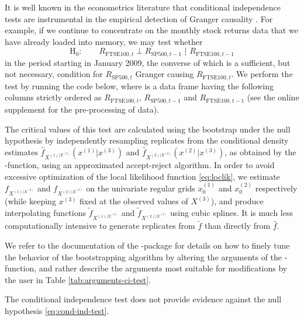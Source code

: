 It is well known in the econometrics literature that conditional independence tests are instrumental in the empirical detection of Granger causality \citep{gran:1980}. For example, if we continue to concentrate on the monthly stock returns data that we have already loaded into memory, we may test whether 
\begin{equation} 
\textrm{H}_0: \qquad R_{\textrm{FTSE100}, t} \perp R_{\textrm{SP500}, t-1} \,\, | \,\, R_{\textrm{FTSE100}, t-1}
\label{eq:cond-ind-test}
\end{equation} 
in the period starting in January 2009, the converse of which is a sufficient, but not necessary, condition for \(R_{\textrm{SP500}, t}\) Granger causing \(R_{\textrm{FTSE100}, t}\). We perform the test by running the code below, where  is a data frame having the following columns strictly ordered as \(R_{\textrm{FTSE100}, t}\), \(R_{\textrm{SP500}, t-1}\) and \(R_{\textrm{FTSE100}, t-1}\) (see the online supplement for the pre-processing of data). 

The critical values of this test are calculated using the bootstrap under the null hypothesis by independently resampling replicates from
the conditional density estimates \(\widehat f_{X^{(1)|X^{(3)}}}(x^{(1)}|x^{(3)})\) and \(\widehat f_{X^{(2)|X^{(3)}}}(x^{(2)}|x^{(3)})\), as obtained by the -function, using an approximated accept-reject algorithm. In order to avoid excessive optimization of the local likelihood function \eqref{eq:loclik}, we estimate \(f_{X^{(1)|X^{(3)}}}\) and \(f_{X^{(2)|X^{(3)}}}\) on the univariate regular grids \(x_0^{(1)}\) and \(x_0^{(2)}\) respectively (while keeping \(x^{(3)}\) fixed at the observed values of \(X^{(3)}\)), and produce interpolating functions \(\tilde f_{X^{(1)|X^{(3)}}}\) and \(\tilde f_{X^{(2)|X^{(3)}}}\) using cubic splines. It is much less computationally intensive to generate replicates from \(\tilde f\) than directly from \(\widehat f\).

We refer to the documentation of the -package for details on how to finely tune the behavior of the bootstrapping algorithm by altering the arguments of the -function, and rather describe the arguments most suitable for modifications by the user in Table \ref{tab:arguments-ci-test}.

The conditional independence test does not provide evidence against the null hypothesis \eqref{eq:cond-ind-test}.

